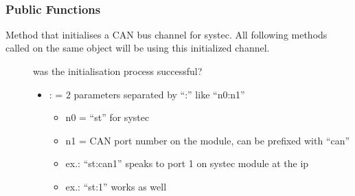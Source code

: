 \documentclass[letterpaper,10pt,english]{sphinxmanual}
\begin{document}
\begin{fulllineitems}
\label{\detokenize{vendors/systec:_CPPv49STCanScan}}%
\pysigstartmultiline
{}\label{\detokenize{vendors/systec:classSTCanScan}}%
\pysigstopmultiline~\subsubsection*{Public Functions}

\begin{fulllineitems}
\label{\detokenize{vendors/systec:_CPPv4N9STCanScan9createBusEK6stringK6string}}%
\pysigstartmultiline
{}\label{\detokenize{vendors/systec:classSTCanScan_1aa99f9f23bdfd367a51efc40e228a6f88}}%
\pysigstopmultiline
Method that initialises a CAN bus channel for systec. All following methods called on the same object will be using this initialized channel.

\begin{description}
\item[{}] \leavevmode
was the initialisation process successful? 

\item[{}] \leavevmode\begin{itemize}
\item {} 
: = 2 parameters separated by “:” like “n0:n1”\begin{itemize}
\item {} 
n0 = “st” for systec

\item {} 
n1 = CAN port number on the module, can be prefixed with “can”

\item {} 
ex.: “st:can1” speaks to port 1 on systec module at the ip

\item {} 
ex.: “st:1” works as well


\end{itemize}
\end{itemize}
\end{description}
\end{fulllineitems}
\end{fulllineitems}
\end{document}
